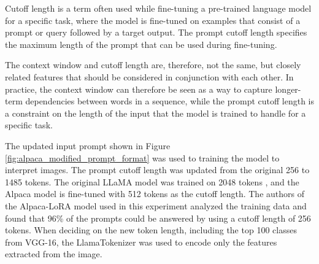         Cutoff length is a term often used while fine-tuning a pre-trained language model for a specific task, where the model is fine-tuned on examples that consist of a prompt or query followed by a target output. The prompt cutoff length specifies the maximum length of the prompt that can be used during fine-tuning.

        The context window and cutoff length are, therefore, not the same, but closely related features that should be considered in conjunction with each other. In practice, the context window can therefore be seen as a way to capture longer-term dependencies between words in a sequence, while the prompt cutoff length is a constraint on the length of the input that the model is trained to handle for a specific task.
        
        

        The updated input prompt shown in Figure \ref{fig:alpaca_modified_prompt_format} was used to training the model to interpret images. The prompt cutoff length was updated from the original 256 to 1485 tokens. The original LLaMA model was trained on 2048 tokens \cite{SequenceContextLength}, and the Alpaca model is fine-tuned with 512 tokens as the cutoff length. The authors of the Alpaca-LoRA model used in this experiment analyzed the training data and found that 96\% of the prompts could be answered by using a cutoff length of 256 tokens. When deciding on the new token length, including the top 100 classes from VGG-16, the LlamaTokenizer was used to encode only the features extracted from the image. 
        
